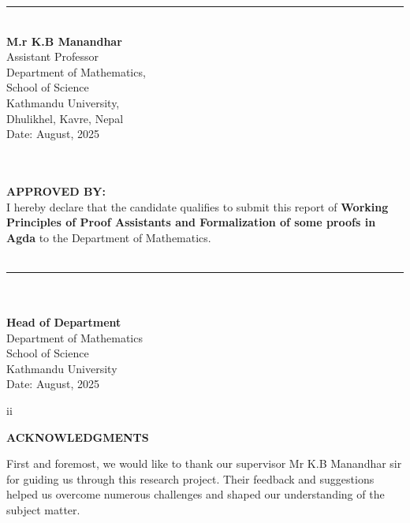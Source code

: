 \documentclass[12pt]{article}
\begin{document}
\vspace{3em}

\noindent
\begin{minipage}{0.45\textwidth}
\rule{6cm}{0.5pt}\\
\textbf{M.r K.B Manandhar }\\
Assistant Professor\\
Department of Mathematics,\\
School of Science\\ Kathmandu University,\\
Dhulikhel, Kavre, Nepal\\
Date: August, 2025

\end{minipage}


\vspace{2.5em}

\noindent
\\ \\ 
\textbf{APPROVED BY:}\\
I hereby declare that the candidate qualifies to submit this report of \textbf{Working Principles of Proof Assistants and Formalization of some proofs in Agda} to the Department of Mathematics.
\\
\vspace{1.7em}
\\
\noindent
\rule{6cm}{0.5pt}\\ \\
\textbf{Head of Department }\\
Department of Mathematics\\
School of Science\\
Kathmandu University\\
Date: August, 2025

\vspace{2em}

\begin{center}
   {\small ii}
\end{center}
\clearpage

\clearpage

\begin{center}
    \textbf{\LARGE ACKNOWLEDGMENTS}
\end{center}
    First and foremost, we would like to thank our supervisor Mr K.B Manandhar sir for guiding us through this research project.
Their feedback and suggestions helped us overcome numerous challenges and shaped
our understanding of the subject matter.


\clearpage
{}  
\end{document}
